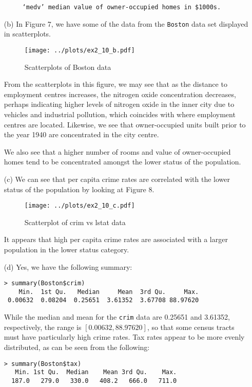 \begin{itemize}
\begin{verbatim}
     ‘medv’ median value of owner-occupied homes in $1000s.
    \end{verbatim}
    \item[(b)] In Figure 7, we have some of the data from the \verb|Boston| data
    set displayed in scatterplots.\par
    \begin{figure}[!ht]
        \texttt{[image: ../plots/ex2\_10\_b.pdf]}
        \caption{Scatterplots of Boston data}
    \end{figure}
    \qquad From the scatterplots in this figure, we may see that as the distance to 
    employment centres increases, the nitrogen oxide concentration decreases,
    perhaps indicating higher levels of nitrogen oxide in the inner city due
    to vehicles and industrial pollution, which coincides with where employment
    centres are located. Likewise, we see that owner-occupied units built prior
    to the year 1940 are concentrated in the city centre.\par
    \qquad We also see that a higher number of rooms and value of owner-occupied 
    homes tend to be concentrated amongst the lower status of the population.
    \item[(c)] We can see that per capita crime rates are correlated with the
    lower status of the population by looking at Figure 8.
    \begin{figure}[!ht]
        \texttt{[image: ../plots/ex2\_10\_c.pdf]}
        \caption{Scatterplot of crim vs lstat data}
    \end{figure}
    It appears that high per capita crime rates are associated with a 
    larger population in the lower status category.
    \item[(d)] Yes, we have the following summary:
    \begin{verbatim}
> summary(Boston$crim)
    Min.  1st Qu.   Median     Mean  3rd Qu.     Max.
 0.00632  0.08204  0.25651  3.61352  3.67708 88.97620
    \end{verbatim}
    While the median and mean for the \verb|crim| data are 
    0.25651 and 3.61352, respectively, the range is $[0.00632, 88.97620]$,
    so that some census tracts must have particularly high crime rates.
    Tax rates appear to be more evenly distributed, as can be seen from the
    following:
    \begin{verbatim}
> summary(Boston$tax)
   Min. 1st Qu.  Median    Mean 3rd Qu.    Max.
  187.0   279.0   330.0   408.2   666.0   711.0
    \end{verbatim}

\end{itemize}
